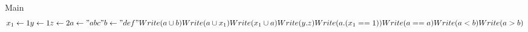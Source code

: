 Main
\[
  x_1 \gets 1
  y \gets 1
  z \gets 2
  a \gets "abc"
  b \gets "def"
  Write(a \cup b)
  Write(a \cup x_1)
  Write(x_1 \cup a)
  Write(y.z)
  Write(a.(x_1==1))
  Write(a == a)
  Write(a < b)
  Write(a > b)

\]